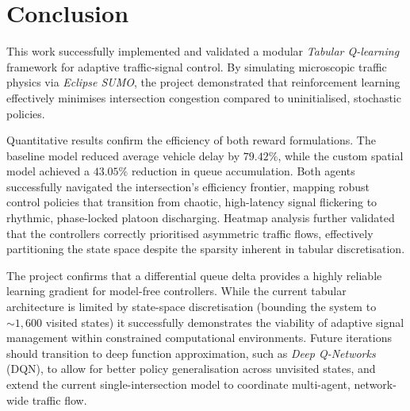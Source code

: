 \documentclass[12pt]{article}
\begin{document}
%


{}
\section*{Conclusion}

This work successfully implemented and validated a modular \emph{Tabular Q-learning} framework for adaptive traffic-signal control. By simulating microscopic traffic physics via \emph{Eclipse SUMO}, the project demonstrated that reinforcement learning effectively minimises intersection congestion compared to uninitialised, stochastic policies. 

Quantitative results confirm the efficiency of both reward formulations. The baseline model reduced average vehicle delay by \( 79.42\% \), while the custom spatial model achieved a \( 43.05\% \) reduction in queue accumulation. Both agents successfully navigated the intersection's efficiency frontier, mapping robust control policies that transition from chaotic, high-latency signal flickering to rhythmic, phase-locked platoon discharging. Heatmap analysis further validated that the controllers correctly prioritised asymmetric traffic flows, effectively partitioning the state space despite the sparsity inherent in tabular discretisation.

The project confirms that a differential queue delta provides a highly reliable learning gradient for model-free controllers. While the current tabular architecture is limited by state-space discretisation (bounding the system to \( \sim 1{,}600 \) visited states) it successfully demonstrates the viability of adaptive signal management within constrained computational environments. Future iterations should transition to deep function approximation, such as \emph{Deep Q-Networks} (DQN), to allow for better policy generalisation across unvisited states, and extend the current single-intersection model to coordinate multi-agent, network-wide traffic flow.
\end{document}
